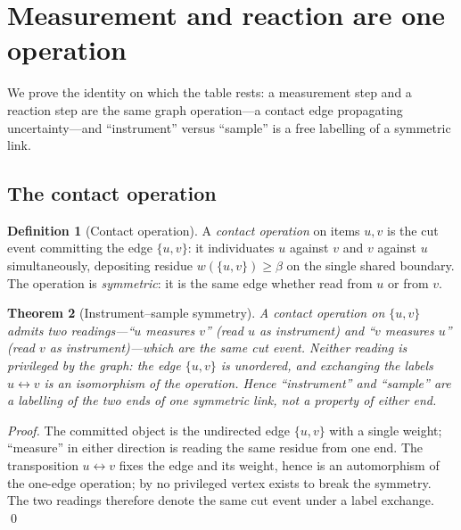 \documentclass[11pt,twocolumn,a4paper]{article}
\theoremstyle{thmstyle}
\newtheorem{theorem}{Theorem}[section]
\theoremstyle{definition}
\newtheorem{definition}[theorem]{Definition}
\theoremstyle{remark}
\newcommand{\wt}{w}
\newcommand{\flo}{\beta}                 %
\begin{document}
\section{Measurement and reaction are one operation}
\label{sec:contact-symmetry}

We prove the identity on which the table rests: a measurement step and a
reaction step are the same graph operation---a contact edge propagating
uncertainty---and ``instrument'' versus ``sample'' is a free labelling of a
symmetric link.

\subsection{The contact operation}

\begin{definition}[Contact operation]
\label{def:contact-op}
A \emph{contact operation} on items $u,v$ is the cut event committing the
edge $\{u,v\}$: it individuates $u$ against $v$ and $v$ against $u$
simultaneously, depositing residue $\wt(\{u,v\})\ge\flo$ on the single
shared boundary. The operation is \emph{symmetric}: it is the same edge
whether read from $u$ or from $v$.
\end{definition}

\begin{theorem}[Instrument--sample symmetry]
\label{thm:symmetry}
A contact operation on $\{u,v\}$ admits two readings---``$u$ measures $v$''
(read $u$ as instrument) and ``$v$ measures $u$'' (read $v$ as
instrument)---which are the same cut event. Neither reading is privileged
by the graph: the edge $\{u,v\}$ is unordered, and exchanging the labels
$u\leftrightarrow v$ is an isomorphism of the operation. Hence
``instrument'' and ``sample'' are a labelling of the two ends of one
symmetric link, not a property of either end.
\end{theorem}

\begin{proof}
The committed object is the undirected edge $\{u,v\}$ with a single weight;
``measure'' in either direction is reading the same residue from one end.
The transposition $u\leftrightarrow v$ fixes the edge and its weight, hence
is an automorphism of the one-edge operation; by  no
privileged vertex exists to break the symmetry. The two readings therefore
denote the same cut event under a label exchange. \qed
\end{proof}
\end{document}
